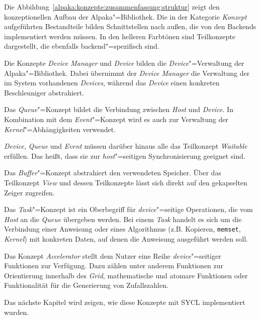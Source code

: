 Die Abbildung~\ref{alpaka:konzepte:zusammenfassung:struktur} zeigt den
konzeptionellen Aufbau der Alpaka"=Bibliothek. Die in der Kategorie
\textit{Konzept} aufgeführten Bestandteile bilden Schnittstellen nach außen, die
von den Backends implementiert werden müssen. In den helleren Farbtönen sind
Teilkonzepte dargestellt, die ebenfalls backend"=spezifisch sind.

Die Konzepte \textit{Device Manager} und \textit{Device} bilden die
\textit{Device}"=Verwaltung der Alpaka"=Bibliothek. Dabei übernimmt der
\textit{Device Manager} die Verwaltung der im System vorhandenen
\textit{Devices}, während das \textit{Device} einen konkreten Beschleuniger
abstrahiert.

Das \textit{Queue}"=Konzept bildet die Verbindung zwischen \textit{Host} und
\textit{Device}. In Kombination mit dem \textit{Event}"=Konzept wird es auch
zur Verwaltung der \textit{Kernel}"=Abhängigkeiten verwendet.

\textit{Device}, \textit{Queue} und \textit{Event} müssen darüber hinaus alle
das Teilkonzept \textit{Waitable} erfüllen. Das heißt, dass sie zur
\textit{host}"=seitigen Synchronisierung geeignet sind.

Das \textit{Buffer}"=Konzept abstrahiert den verwendeten Speicher. Über das
Teilkonzept \textit{View} und dessen Teilkonzepte lässt sich direkt auf den
gekapselten Zeiger zugreifen.

Das \textit{Task}"=Konzept ist ein Oberbegriff für \textit{device}"=seitige
Operationen, die vom \textit{Host} an die \textit{Queue} übergeben werden. Bei
einem \textit{Task} handelt es sich um die Verbindung einer Anweisung oder eines
Algorithmus (z.B. Kopieren, \texttt{memset}, \textit{Kernel}) mit konkreten
Daten, auf denen die Anweisung ausgeführt werden soll.

Das Konzept \textit{Accelerator} stellt dem Nutzer eine Reihe
\textit{device}"=seitiger Funktionen zur Verfügung. Dazu zählen unter anderem
Funktionen zur Orientierung innerhalb des \textit{Grid}, mathematische und
atomare Funktionen oder Funktionalität für die Generierung von Zufallszahlen.

Das nächste Kapitel wird zeigen, wie diese Konzepte mit SYCL implementiert
wurden.


